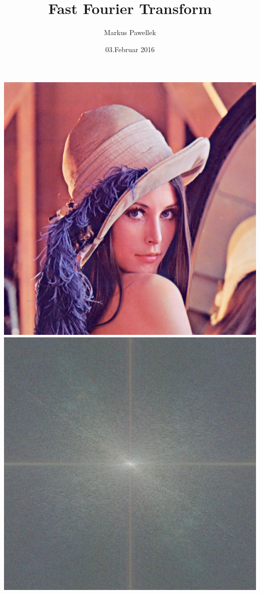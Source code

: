 \documentclass[aspectratio=169]{beamer}
\title{Fast Fourier Transform}
\author{Markus Pawellek}
\date{03.Februar 2016}
\begin{document}
	
	\frame{\maketitle}

	\begin{frame}
		\center
		\includegraphics[scale=0.35]{example/picture-01.png}
		\hfill
		\includegraphics[scale=0.35]{example/picture-01-spec.png}
	\end{frame}
\end{document}
